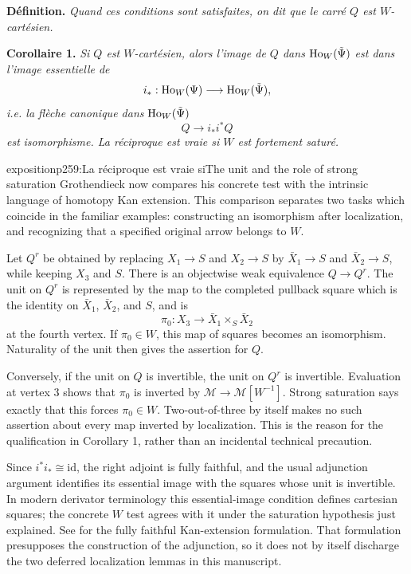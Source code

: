
\textbf{Définition.} \textit{Quand ces conditions sont satisfaites, on dit que le carré $Q$ est $W$-cartésien.}

\textbf{Corollaire 1.} \textit{Si $Q$ est $W$-cartésien, alors l'image de $Q$ dans} $\mathrm{Ho}_W(\tilde{\Psi})$ \textit{est dans l'image essentielle de}
\[
i_* : \mathrm{Ho}_W(\Psi)\longrightarrow\mathrm{Ho}_W(\tilde{\Psi}),
\]
\textit{i.e. la flèche canonique dans} $\mathrm{Ho}_W(\tilde{\Psi})$
\[
Q\longrightarrow i_*i^*Q
\]
\textit{est} \textit{isomorphisme. La réciproque est vraie si $W$ est fortement saturé.}

\begin{dcomment}{exposition}{p259:La réciproque est vraie si}{The unit and the role of strong saturation}
Grothendieck now compares his concrete test with the intrinsic language of homotopy Kan extension. This comparison separates two tasks which coincide in the familiar examples: constructing an isomorphism after localization, and recognizing that a specified original arrow belongs to $W$.

Let $Q^r$ be obtained by replacing $X_1\to S$ and $X_2\to S$ by $\bar X_1\to S$ and $\bar X_2\to S$, while keeping $X_3$ and $S$. There is an objectwise weak equivalence $Q\to Q^r$. The unit on $Q^r$ is represented by the map to the completed pullback square which is the identity on $\bar X_1$, $\bar X_2$, and $S$, and is
\[
 \pi_0:X_3\longrightarrow\bar X_1\times_S\bar X_2
\]
at the fourth vertex. If $\pi_0\in W$, this map of squares becomes an isomorphism. Naturality of the unit then gives the assertion for $Q$.

Conversely, if the unit on $Q$ is invertible, the unit on $Q^r$ is invertible. Evaluation at vertex 3 shows that $\pi_0$ is inverted by $\mathcal M\to\mathcal M[W^{-1}]$. Strong saturation says exactly that this forces $\pi_0\in W$. Two-out-of-three by itself makes no such assertion about every map inverted by localization. This is the reason for the qualification in Corollary 1, rather than an incidental technical precaution.

Since $i^*i_*\cong\mathrm{id}$, the right adjoint is fully faithful, and the usual adjunction argument identifies its essential image with the squares whose unit is invertible. In modern derivator terminology this essential-image condition defines cartesian squares; the concrete $W$ test agrees with it under the saturation hypothesis just explained. See \citet[Proposition 1.20 and Lemma 1.21]{Groth2013} for the fully faithful Kan-extension formulation. That formulation presupposes the construction of the adjunction, so it does not by itself discharge the two deferred localization lemmas in this manuscript.
\end{dcomment}


